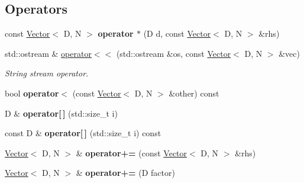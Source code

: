 \subsection*{Operators}
\begin{DoxyCompactItemize}
\item 
\mbox{\label{classrev_1_1_vector_a44081a53c0fbf7784ac1887510caeec8}} 
const \mbox{\hyperlink{classrev_1_1_vector}{Vector}}$<$ D, N $>$ {\bfseries operator $\ast$} (D d, const \mbox{\hyperlink{classrev_1_1_vector}{Vector}}$<$ D, N $>$ \&rhs)
\item 
\mbox{\label{classrev_1_1_vector_aa276d2bd10205e17f81e9a5f80b9dabb}} 
std\+::ostream \& \mbox{\hyperlink{classrev_1_1_vector_aa276d2bd10205e17f81e9a5f80b9dabb}{operator$<$$<$}} (std\+::ostream \&os, const \mbox{\hyperlink{classrev_1_1_vector}{Vector}}$<$ D, N $>$ \&vec)
\begin{DoxyCompactList}\small\item\em String stream operator. \end{DoxyCompactList}\item 
\mbox{\label{classrev_1_1_vector_accff848e83da3f82cc240cca4ee71292}} 
bool {\bfseries operator$<$} (const \mbox{\hyperlink{classrev_1_1_vector}{Vector}}$<$ D, N $>$ \&other) const
\item 
\mbox{\label{classrev_1_1_vector_a092fa44fce3c8d7ca2ce49e466e7d2b2}} 
D \& {\bfseries operator\mbox{[}$\,$\mbox{]}} (std\+::size\+\_\+t i)
\item 
\mbox{\label{classrev_1_1_vector_a9f64b6e945a3018f1a192209e6455c82}} 
const D \& {\bfseries operator\mbox{[}$\,$\mbox{]}} (std\+::size\+\_\+t i) const
\item 
\mbox{\label{classrev_1_1_vector_ad894f0fd3eb53031da8e86ad9e8b542e}} 
\mbox{\hyperlink{classrev_1_1_vector}{Vector}}$<$ D, N $>$ \& {\bfseries operator+=} (const \mbox{\hyperlink{classrev_1_1_vector}{Vector}}$<$ D, N $>$ \&rhs)
\item 
\mbox{\label{classrev_1_1_vector_a54c13ad0ea67d85c2153db4c73388e3b}} 
\mbox{\hyperlink{classrev_1_1_vector}{Vector}}$<$ D, N $>$ \& {\bfseries operator+=} (D factor)

\end{DoxyCompactItemize}
